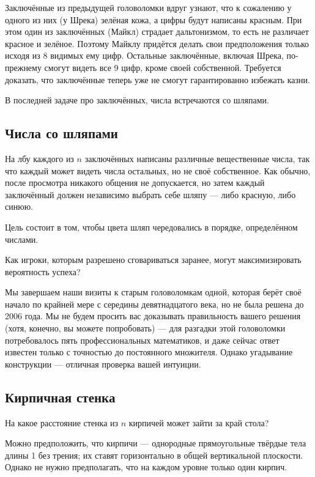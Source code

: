 Заключённые из предыдущей головоломки вдруг узнают, что к сожалению у одного из них (у Шрека) зелёная кожа,
а цифры будут написаны красным.
При этом один из заключённых (Майкл) страдает дальтонизмом, то есть не различает красное и зелёное.
Поэтому Майклу придётся делать свои предположения только исходя из 8 видимых ему цифр.
Остальные заключённые, включая Шрека, по-прежнему смогут видеть все 9 цифр, кроме своей собственной.
Требуется доказать, что заключённые теперь уже не смогут гарантированно избежать казни.

\medskip

В последней задаче про заключённых, числа встречаются со шляпами. 

\subsection*{Числа со шляпами}

На лбу каждого из $n$ заключённых написаны различные вещественные числа, так что каждый может видеть числа остальных, но не своё собственное.
Как обычно, после просмотра никакого общения не допускается, но затем каждый заключённый должен независимо выбрать себе шляпу --- либо красную, либо синюю.

Цель состоит в том, чтобы цвета шляп чередовались в порядке, определённом числами.

Как игроки, которым разрешено сговариваться заранее, могут максимизировать вероятность успеха?

\medskip

Мы завершаем наши визиты к старым головоломкам одной, которая берёт своё начало по крайней мере с середины девятнадцатого века, но не была решена до 2006 года.
Мы не будем просить вас доказывать правильность вашего решения (хотя, конечно, вы можете попробовать) --- для разгадки этой головоломки потребовалось пять профессиональных математиков, и даже сейчас ответ известен только с точностью до постоянного множителя.
Однако угадывание конструкции --- отличная проверка вашей интуиции.

\subsection*{Кирпичная стенка}\label{Кирпичная стенка}

На какое расстояние стенка из $n$ кирпичей может зайти за край стола?

 Можно предположить, что кирпичи --- однородные прямоугольные твёрдые тела длины 1 без трения;
их ставят горизонтально в общей вертикальной плоскости.
Однако не нужно предполагать, что на каждом уровне только один кирпич.

